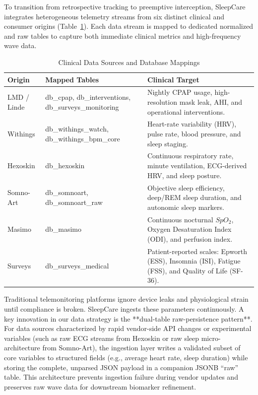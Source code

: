 \documentclass[conference]{IEEEtran}
\begin{document}
To transition from retrospective tracking to preemptive interception, SleepCare integrates heterogeneous telemetry streams from six distinct clinical and consumer origins (Table~\ref{tab:sources}). Each data stream is mapped to dedicated normalized and raw tables to capture both immediate clinical metrics and high-frequency wave data. 

\begin{table}[htbp]
\caption{Clinical Data Sources and Database Mappings}
\label{tab:sources}
\begin{center}
\begin{tabular}{p{1.4cm}p{2.6cm}p{3.2cm}}
\toprule
\textbf{Origin} & \textbf{Mapped Tables} & \textbf{Clinical Target} \\
\midrule
LMD / Linde
  & db\_cpap, db\_interventions, db\_surveys\_monitoring
  & Nightly CPAP usage, high-resolution mask leak, AHI, and operational interventions. \\
\addlinespace
Withings
  & db\_withings\_watch, db\_withings\_bpm\_core
  & Heart-rate variability (HRV), pulse rate, blood pressure, and sleep staging. \\
\addlinespace
Hexoskin
  & db\_hexoskin
  & Continuous respiratory rate, minute ventilation, ECG-derived HRV, and sleep posture. \\
\addlinespace
Somno-Art
  & db\_somnoart, db\_somnoart\_raw
  & Objective sleep efficiency, deep/REM sleep duration, and autonomic sleep markers. \\
\addlinespace
Masimo
  & db\_masimo
  & Continuous nocturnal $SpO_2$, Oxygen Desaturation Index (ODI), and perfusion index. \\
\addlinespace
Surveys
  & db\_surveys\_medical
  & Patient-reported scales: Epworth (ESS), Insomnia (ISI), Fatigue (FSS), and Quality of Life (SF-36). \\
\bottomrule
\end{tabular}
\end{center}
\end{table}

Traditional telemonitoring platforms ignore device leaks and physiological strain until compliance is broken. SleepCare ingests these parameters continuously. A key innovation in our data strategy is the **dual-table raw-persistence pattern**. For data sources characterized by rapid vendor-side API changes or experimental variables (such as raw ECG streams from Hexoskin or raw sleep micro-architecture from Somno-Art), the ingestion layer writes a validated subset of core variables to structured fields (e.g., average heart rate, sleep duration) while storing the complete, unparsed JSON payload in a companion JSONB ``raw'' table. This architecture prevents ingestion failure during vendor updates and preserves raw wave data for downstream biomarker refinement.
\end{document}
